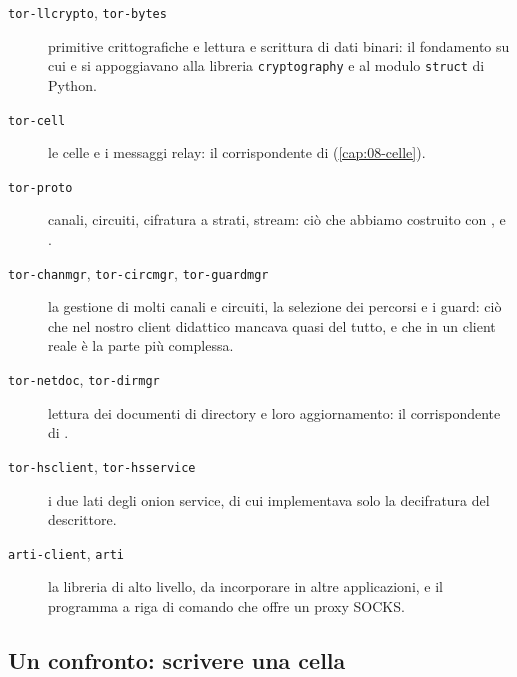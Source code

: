 \begin{description}
  \item[\texttt{tor-llcrypto}, \texttt{tor-bytes}] primitive crittografiche e lettura e scrittura di dati binari: il fondamento su cui  e  si appoggiavano alla libreria \texttt{cryptography} e al modulo \texttt{struct} di Python.
  \item[\texttt{tor-cell}] le celle e i messaggi relay: il corrispondente di  (\cref{cap:08-celle}).
  \item[\texttt{tor-proto}] canali, circuiti, cifratura a strati, stream: ciò che abbiamo costruito con ,  e .
  \item[\texttt{tor-chanmgr}, \texttt{tor-circmgr}, \texttt{tor-guardmgr}] la gestione di molti canali e circuiti, la selezione dei percorsi e i guard: ciò che nel nostro client didattico mancava quasi del tutto, e che in un client reale è la parte più complessa.
  \item[\texttt{tor-netdoc}, \texttt{tor-dirmgr}] lettura dei documenti di directory e loro aggiornamento: il corrispondente di .
  \item[\texttt{tor-hsclient}, \texttt{tor-hsservice}] i due lati degli onion service, di cui  implementava solo la decifratura del descrittore.
  \item[\texttt{arti-client}, \texttt{arti}] la libreria di alto livello, da incorporare in altre applicazioni, e il programma a riga di comando che offre un proxy SOCKS.
\end{description}

\subsection{Un confronto: scrivere una cella}

